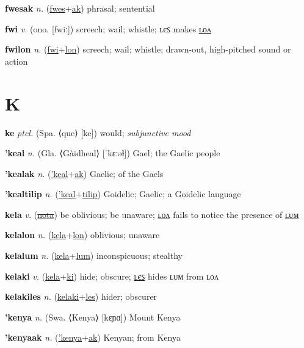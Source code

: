 \textbf{\hypertarget{fwesak}{fwesak}} \textit{n.} (\hyperlink{fwes}{fwes}+\allowbreak \hyperlink{ak}{ak})
phrasal; sentential

\textbf{\hypertarget{fwi}{fwi}} \textit{v.} (ono. [fwiː])
screech; wail; whistle; ʟєꜱ makes \hyperlink{fwilon}{ʟᴏᴧ}

\textbf{\hypertarget{fwilon}{fwilon}} \textit{n.} (\hyperlink{fwi}{fwi}+\allowbreak \hyperlink{lon}{lon})
screech; wail; whistle; drawn-out, high-pitched sound or action

\section{K}

\textbf{\hypertarget{ke}{ke}} \textit{ptcl.} (Spa. ⟨que⟩ [ke])
would; \textit{subjunctive mood}

\textbf{\hypertarget{'keal}{'keal}} \textit{n.} (Gla. ⟨Gàidheal⟩ [ˈkɛːəɫ])
Gael; the Gaelic people

\textbf{\hypertarget{'kealak}{'kealak}} \textit{n.} (\hyperlink{'keal}{'keal}+\allowbreak \hyperlink{ak}{ak})
Gaelic; of the Gaels

\textbf{\hypertarget{'kealtilip}{'kealtilip}} \textit{n.} (\hyperlink{'keal}{'keal}+\allowbreak \hyperlink{tilip}{tilip})
Goidelic; Gaelic; a Goidelic language

\textbf{\hypertarget{kela}{kela}} \textit{v.} (\hyperlink{nota}{\sout{nota}})
be oblivious; be unaware; \hyperlink{kelalon}{ʟᴏᴧ} fails to notice the presence of \hyperlink{kelalum}{ʟᴜᴍ}

\textbf{\hypertarget{kelalon}{kelalon}} \textit{n.} (\hyperlink{kela}{kela}+\allowbreak \hyperlink{lon}{lon})
oblivious; unaware

\textbf{\hypertarget{kelalum}{kelalum}} \textit{n.} (\hyperlink{kela}{kela}+\allowbreak \hyperlink{lum}{lum})
inconspicuous; stealthy

\textbf{\hypertarget{kelaki}{kelaki}} \textit{v.} (\hyperlink{kela}{kela}+\allowbreak \hyperlink{ki}{ki})
hide; obscure; \hyperlink{kelakiles}{ʟєꜱ} hides ʟᴜᴍ from ʟᴏᴧ

\textbf{\hypertarget{kelakiles}{kelakiles}} \textit{n.} (\hyperlink{kelaki}{kelaki}+\allowbreak \hyperlink{les}{les})
hider; obscurer

\textbf{\hypertarget{'kenya}{'kenya}} \textit{n.} (Swa. ⟨Kenya⟩ [kɛɲɑ])
Mount Kenya

\textbf{\hypertarget{'kenyaak}{'kenyaak}} \textit{n.} (\hyperlink{'kenya}{'kenya}+\allowbreak \hyperlink{ak}{ak})
Kenyan; from Kenya

